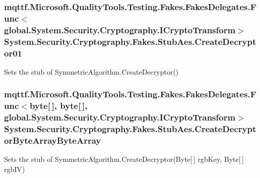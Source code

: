 \hypertarget{class_system_1_1_security_1_1_cryptography_1_1_fakes_1_1_stub_aes_acc02ee5089bbeee0bbe43cfdb432e33b}{
\subsubsection[{Create\-Decryptor01}]{\setlength{\rightskip}{0pt plus 5cm}mqttf.\-Microsoft.\-Quality\-Tools.\-Testing.\-Fakes.\-Fakes\-Delegates.\-Func$<$global.\-System.\-Security.\-Cryptography.\-I\-Crypto\-Transform$>$ System.\-Security.\-Cryptography.\-Fakes.\-Stub\-Aes.\-Create\-Decryptor01}}\label{class_system_1_1_security_1_1_cryptography_1_1_fakes_1_1_stub_aes_acc02ee5089bbeee0bbe43cfdb432e33b}


Sets the stub of Symmetric\-Algorithm.\-Create\-Decryptor()

\hypertarget{class_system_1_1_security_1_1_cryptography_1_1_fakes_1_1_stub_aes_a661df8f5c8ee5fe92273a0b0409566a4}{
\subsubsection[{Create\-Decryptor\-Byte\-Array\-Byte\-Array}]{\setlength{\rightskip}{0pt plus 5cm}mqttf.\-Microsoft.\-Quality\-Tools.\-Testing.\-Fakes.\-Fakes\-Delegates.\-Func$<$byte\mbox{[}$\,$\mbox{]}, byte\mbox{[}$\,$\mbox{]}, global.\-System.\-Security.\-Cryptography.\-I\-Crypto\-Transform$>$ System.\-Security.\-Cryptography.\-Fakes.\-Stub\-Aes.\-Create\-Decryptor\-Byte\-Array\-Byte\-Array}}\label{class_system_1_1_security_1_1_cryptography_1_1_fakes_1_1_stub_aes_a661df8f5c8ee5fe92273a0b0409566a4}


Sets the stub of Symmetric\-Algorithm.\-Create\-Decryptor(\-Byte\mbox{[}$\,$\mbox{]} rgb\-Key, Byte\mbox{[}$\,$\mbox{]} rgb\-I\-V)

